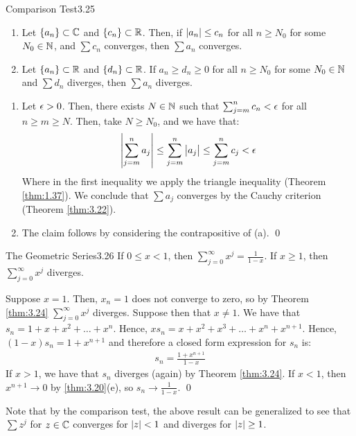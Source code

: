 \begin{theorem}{Comparison Test}{3.25}
    \begin{enumerate}
        \item Let $\set{a_n} \subset \mathbb{C}$ and $\set{c_n} \subset \mathbb{R}$. Then, if $\abs{a_n} \leq c_n$ for all $n \geq N_0$ for some $N_0 \in \mathbb{N}$, and $\sum c_n$ converges, then $\sum a_n$ converges. 
        \item Let $\set{a_n} \subset \mathbb{R}$ and $\set{d_n} \subset \mathbb{R}$. If $a_n \geq d_n \geq 0$ for all $n \geq N_0$ for some $N_0 \in \mathbb{N}$ and $\sum d_n$ diverges, then $\sum a_n$ diverges.
    \end{enumerate}
\end{theorem}
\begin{nproof}
    \begin{enumerate}
        \item Let $\epsilon > 0$. Then, there exists $N \in \mathbb{N}$ such that $\sum_{j = m}^n c_n < \epsilon$ for all $n \geq m \geq N$. Then, take $N \geq N_0$, and we have that:
        \begin{align*}
            \abs{\sum_{j=m}^n a_j} \leq \sum_{j=m}^n \abs{a_j} \leq \sum_{j=m}^n c_j < \epsilon
        \end{align*}
        Where in the first inequality we apply the triangle inequality (Theorem \ref{thm:1.37}). We conclude that $\sum a_j$ converges by the Cauchy criterion (Theorem \ref{thm:3.22}).
        \item The claim follows by considering the contrapositive of (a). \qed
    \end{enumerate}
\end{nproof}

\begin{theorem}{The Geometric Series}{3.26}
    If $0 \leq x < 1$, then $\sum_{j=0}^\infty x^j = \frac{1}{1-x}$. If $x \geq 1$, then $\sum_{j=0}^\infty x^j$ diverges.
\end{theorem}
\begin{nproof}
    Suppose $x = 1$. Then, $x_n = 1$ does not converge to zero, so by Theorem \ref{thm:3.24} $\sum_{j=0}^\infty x^j$ diverges. Suppose then that $x \neq 1$. We have that $s_n = 1 + x + x^2 + \ldots + x^n$. Hence, $xs_n = x + x^2 + x^3 + \ldots + x^n + x^{n+1}$. Hence, $(1-x)s_n = 1 + x^{n+1}$ and therefore a closed form expression for $s_n$ is:
    \begin{align*}
        s_n = \frac{1 + x^{n+1}}{1 - x}
    \end{align*}
    If $x > 1$, we have that $s_n$ diverges (again) by Theorem \ref{thm:3.24}. If $x < 1$, then $x^{n+1} \rightarrow 0$ by \ref{thm:3.20}(e), so $s_n \rightarrow \frac{1}{1-x}$. \qed
\end{nproof}
\noindent Note that by the comparison test, the above result can be generalized to see that $\sum z^j$ for $z \in \mathbb{C}$ converges for $\abs{z} < 1$ and diverges for $\abs{z} \geq 1$. 


